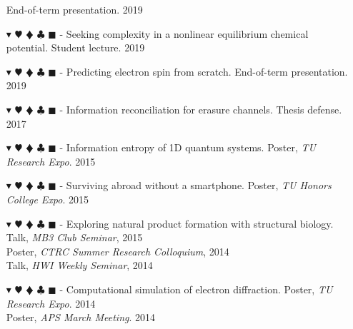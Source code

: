 \documentclass[overlapped, 10pt]{res} %
\newcommand{\physics}{$\blacktriangledown$}
\newcommand{\biochem}{$\varheartsuit$}
\newcommand{\shannon}{$\vardiamondsuit$}
\newcommand{\classic}{$\clubsuit$}
\newcommand{\quantum}{$\blacksquare$}
\newcommand{\physicscolor}{\color{YellowOrange}}
\newcommand{\biochemcolor}{\color{Emerald}}
\newcommand{\shannoncolor}{\color{Goldenrod}}
\newcommand{\classiccolor}{\color{Cyan}}
\newcommand{\quantumcolor}{\color{RedOrange}}
\newcommand{\tag}[1]{
    {\IfSubStr{#1}{\physics}{\physicscolor}{\color{White}}\physics}
    {\IfSubStr{#1}{\biochem}{\biochemcolor}{\color{White}}\biochem}
    {\IfSubStr{#1}{\shannon}{\shannoncolor}{\color{White}}\shannon}
    {\IfSubStr{#1}{\classic}{\classiccolor}{\color{White}}\classic}
    {\IfSubStr{#1}{\quantum}{\quantumcolor}{\color{White}}\quantum}
}
\begin{document}
\begin{resume}
\begin{itemize}
    \hfill End-of-term presentation. 2019
\item[\tag{\biochem}-] Seeking complexity in a nonlinear equilibrium chemical potential.
    \hfill Student lecture. 2019
\item[\tag{\physics}-] Predicting electron spin from scratch.
    \hfill End-of-term presentation. 2019
\item[\tag{\shannon\classic}-] Information reconciliation for erasure channels.
    \hfill Thesis defense. 2017
\item[\tag{\physics\shannon\classic}-] Information entropy of 1D quantum systems.
    \hfill Poster, \textit{TU Research Expo}. 2015
\item[\tag{}-] Surviving abroad without a smartphone.
    \hfill Poster, \textit{TU Honors College Expo}. 2015
\item[\tag{\biochem\classic}-] Exploring natural product formation with structural biology.
    \hfill Talk, \textit{MB3 Club Seminar}, 2015
    \\ \null \hfill Poster, \textit{CTRC Summer Research Colloquium}, 2014
    \\ \null \hfill Talk, \textit{HWI Weekly Seminar}, 2014
\item[\tag{\physics\classic}-] Computational simulation of electron diffraction.
    \hfill Poster, \textit{TU Research Expo}. 2014
    \\ \null \hfill Poster, \textit{APS March Meeting}. 2014
\end{itemize}



\end{resume}
\end{document}
